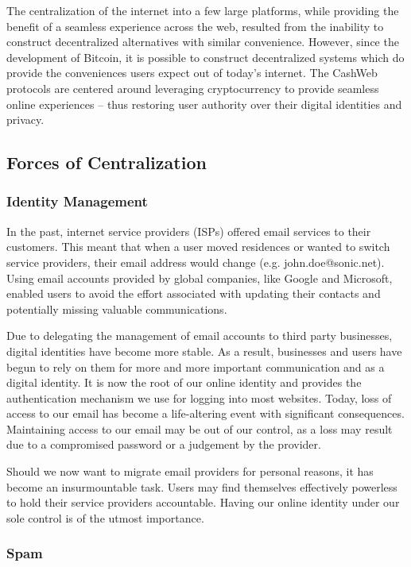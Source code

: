 \documentclass{article}
\begin{document}
The centralization of the internet into a few large platforms, while providing the benefit of a seamless experience across the web, resulted from the inability to construct decentralized alternatives with similar convenience. However, since the development of Bitcoin\cite{nakamoto2008bpp}, it is possible to construct decentralized systems which do provide the conveniences users expect out of today's internet. The CashWeb protocols are centered around leveraging cryptocurrency to provide seamless online experiences -- thus restoring user authority over their digital identities and privacy. 

\subsection{Forces of Centralization}

\subsubsection{Identity Management}

In the past, internet service providers (ISPs) offered email services to their customers. This meant that when a user moved residences or wanted to switch service providers, their email address would change (e.g. john.doe@sonic.net). Using email accounts provided by global companies, like Google and Microsoft, enabled users to avoid the effort associated with updating their contacts and potentially missing valuable communications.

Due to delegating the management of email accounts to third party businesses, digital identities have become more stable. As a result, businesses and users have begun to rely on them for more and more important communication and as a digital identity. It is now the root of our online identity and provides the authentication mechanism we use for logging into most websites. Today, loss of access to our email has become a life-altering event with significant consequences. Maintaining access to our email may be out of our control, as a loss may result due to a compromised password or a judgement by the provider. 

Should we now want to migrate email providers for personal reasons, it has become an insurmountable task. Users may find themselves effectively powerless to hold their service providers accountable. Having our online identity under our sole control is of the utmost importance.

\subsubsection{Spam}
\end{document}

